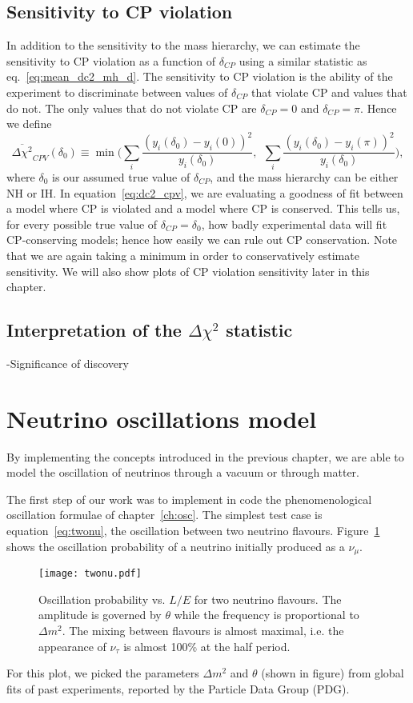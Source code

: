 \subsection{Sensitivity to CP violation}
In addition to the sensitivity to the mass hierarchy, we can estimate the
sensitivity to CP violation as a function of $\delta_{CP}$ using a similar
statistic as eq.~\ref{eq:mean_dc2_mh_d}. The sensitivity to CP violation
is the ability of the experiment to discriminate between values of
$\delta_{CP}$ that violate CP and values that do not. The only values that
do not violate CP are $\delta_{CP}=0$ and $\delta_{CP}=\pi$. Hence we define
\begin{equation}
	\overline{\Delta\chi^2}_{CPV}(\delta_0) \equiv \min\bigg(\sum_i
	\frac{(y_i(\delta_0) - y_i(0))^2}{y_i(\delta_0)},~~\sum_i
	\frac{(y_i(\delta_0) - y_i(\pi))^2}{y_i(\delta_0)}\bigg),\label{eq:dc2_cpv}
\end{equation}
where $\delta_0$ is our assumed true value of $\delta_{CP}$, and the mass
hierarchy can be either NH or IH. In equation~\ref{eq:dc2_cpv}, we are
evaluating a goodness of fit between a model where CP is violated and a model
where CP is conserved. This tells us, for every possible true value of
$\delta_{CP}=\delta_0$, how badly experimental data will fit CP-conserving
models; hence how easily we can rule out CP conservation. Note that we are
again taking a minimum in order to conservatively estimate sensitivity.
We will also show plots of CP violation sensitivity later in this chapter. 

\subsection{Interpretation of the $\Delta\chi^2$ statistic}
-Significance of discovery

\section{Neutrino oscillations model}
By implementing the concepts introduced in the previous chapter, we are able to
model the oscillation of neutrinos through a vacuum or through matter.

The first step of our work was to implement in code the phenomenological
oscillation formulae of chapter~\ref{ch:osc}. The simplest test case
is equation~\ref{eq:twonu}, the oscillation between two neutrino flavours.
Figure~\ref{fig:twonu_plots} shows the oscillation
probability of a neutrino initially produced as a $\nu_\mu$. 
\begin{figure}
	\centering
	\texttt{[image: twonu.pdf]}
	\captionsetup{width=0.9\textwidth}
	\caption{Oscillation probability vs. $L/E$ for two neutrino flavours. The
	amplitude is governed by $\theta$ while the frequency is proportional to
	$\Delta m^2$. The mixing between flavours is almost maximal, i.e. the
	appearance of $\nu_\tau$ is almost 100\% at the half period.}
	\label{fig:twonu_plots}
\end{figure}
For this plot, we picked the parameters $\Delta m^2$ and $\theta$ (shown in
figure) from global fits of past experiments, reported by the Particle Data
Group (PDG)\cite{pdg}.

